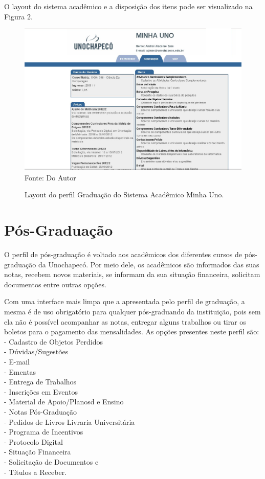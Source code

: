 O layout do sistema acadêmico e a disposição dos itens pode ser visualizado na Figura 2.

\begin{figure}[!htb]
     \centering
     \caption[Layout do Sistema - Perfil Graduação]{Layout do perfil Graduação do Sistema Acadêmico Minha Uno.}
     \includegraphics[scale=0.3]{imagens/GraduacaoCorrigida.png}
     \\ Fonte: Do Autor
\end{figure}

\newpage
\section{Pós-Graduação}
O perfil de pós-graduação é voltado aos acadêmicos dos diferentes cursos de pós-graduação da Unochapecó. 
Por meio dele, os acadêmicos são informados das  suas notas, recebem novos materiais, 
se informam da sua situação financeira, solicitam documentos entre outras opções.

Com uma interface mais limpa que a apresentada pelo perfil de graduação, a mesma é de uso obrigatório para qualquer 
pós-graduando da instituição, pois sem ela não é possível acompanhar as notas, entregar alguns trabalhos ou 
tirar os boletos para o pagamento das mensalidades. As opções presentes neste perfil são: \\
- Cadastro de Objetos Perdidos \\
- Dúvidas/Sugestões \\
- E-mail \\
- Ementas \\
- Entrega de Trabalhos \\
- Inscrições em Eventos \\
- Material de Apoio/Planosd e Ensino \\
- Notas Pós-Graduação \\
- Pedidos de Livros Livraria Universitária \\
- Programa de Incentivos \\
- Protocolo Digital \\
- Situação Financeira \\
- Solicitação de Documentos e \\
- Títulos a Receber. \\


